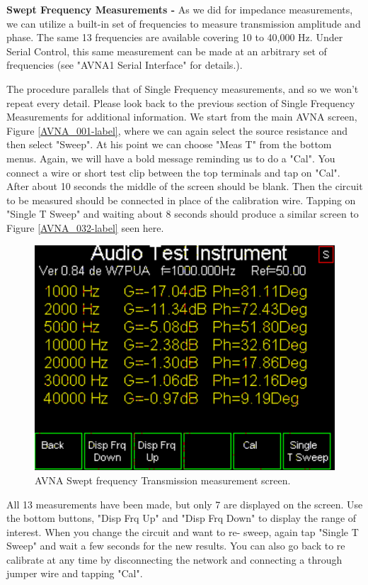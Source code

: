\textbf{Swept Frequency Measurements - } As we did for impedance measurements, we can utilize a built-in set of frequencies to measure transmission amplitude and phase.  The same 13 frequencies are available covering 10 to 40,000 Hz.  Under Serial Control, this same measurement can be made at an arbitrary set of frequencies (see "AVNA1 Serial Interface" for details.).

The procedure parallels that of Single Frequency measurements, and so we won't repeat every detail.  Please look back to the previous section of Single Frequency Measurements  for additional information.  We start from the main AVNA screen, Figure \ref{AVNA_001-label}, where we can again select the source resistance and then select "\textsf{Sweep}".  At his point we can choose "\textsf{Meas T}" from the bottom menus.  Again, we will have a bold message reminding us to do a "\textsf{Cal}".  You connect a wire or short test clip between the top terminals and tap on "\textsf{Cal}".  After  about 10 seconds the middle of the screen should be blank. Then the circuit to be measured should be connected in place of the calibration wire.  Tapping on "\textsf{Single T Sweep}" and waiting about 8 seconds should produce a similar screen to Figure  \ref{AVNA_032-label} seen here.
\begin{figure}[H]
\begin{center}
\includegraphics[scale=0.75]{./images/AVNA_037.pdf}
\caption{AVNA Swept frequency Transmission measurement screen.}
\label{AVNA_037-label} 
\end{center}
\end{figure}
%
All 13 measurements have been made, but only 7 are displayed on the screen.  Use the bottom buttons, "\textsf{Disp Frq Up}" and "\textsf{Disp Frq Down}" to display the range of interest.  When you change the circuit and want to re- sweep, again tap "\textsf{Single T Sweep}" and wait a few seconds for the new results.  You can also go back to re calibrate at any time by disconnecting the network and connecting a through jumper wire and tapping "\textsf{Cal}".


